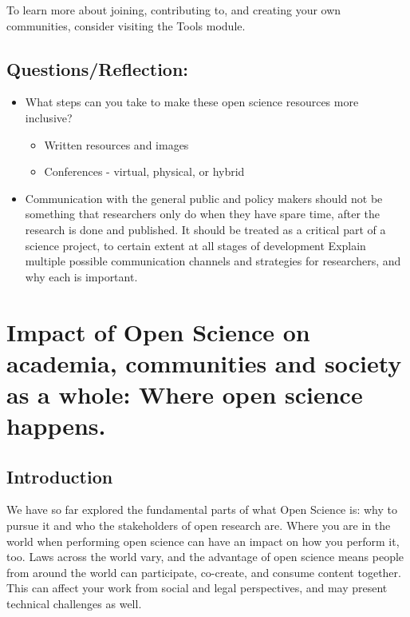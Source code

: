 \documentclass[
  letterpaper,
  DIV=11,
  numbers=noendperiod]{scrreport}
\providecommand{\tightlist}{%
  \setlength{\itemsep}{0pt}\setlength{\parskip}{0pt}}\usepackage{longtable,booktabs,array}
\begin{document}
To learn more about joining, contributing to, and creating your own
communities, consider visiting the Tools module.

\hypertarget{questionsreflection-2}{%
\section{Questions/Reflection:}\label{questionsreflection-2}}

\begin{itemize}
\tightlist
\item
  What steps can you take to make these open science resources more
  inclusive?

  \begin{itemize}
  \tightlist
  \item
    Written resources and images
  \item
    Conferences - virtual, physical, or hybrid
  \end{itemize}
\item
  Communication with the general public and policy makers should not be
  something that researchers only do when they have spare time, after
  the research is done and published. It should be treated as a critical
  part of a science project, to certain extent at all stages of
  development Explain multiple possible communication channels and
  strategies for researchers, and why each is important.
\end{itemize}

\hypertarget{impact-of-open-science-on-academia-communities-and-society-as-a-whole-where-open-science-happens.}{%
\chapter{Impact of Open Science on academia, communities and society as
a whole: Where open science
happens.}\label{impact-of-open-science-on-academia-communities-and-society-as-a-whole-where-open-science-happens.}}

\hypertarget{introduction-3}{%
\section{Introduction}\label{introduction-3}}

We have so far explored the fundamental parts of what Open Science is:
why to pursue it and who the stakeholders of open research are. Where
you are in the world when performing open science can have an impact on
how you perform it, too. Laws across the world vary, and the advantage
of open science means people from around the world can participate,
co-create, and consume content together. This can affect your work from
social and legal perspectives, and may present technical challenges as
well.
\end{document}
